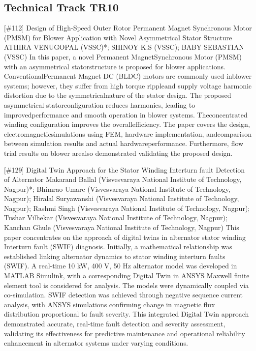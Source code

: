 \clearpage \subsection{Technical Track TR10}\nopagebreak {} \begin{abstract_online} {[\#112] Design of High-Speed Outer Rotor Permanent Magnet Synchronous Motor (PMSM) for Blower Application with Novel Asymmetrical Stator Structure} {} {ATHIRA VENUGOPAL (VSSC)*; SHINOY K.S (VSSC); BABY SEBASTIAN (VSSC)} {} In this paper, a novel Permanent MagnetSynchronous Motor (PMSM) with an asymmetrical statorstructure is proposed for blower applications. ConventionalPermanent Magnet DC (BLDC) motors are commonly used inblower systems; however, they suffer from high torque rippleand supply voltage harmonic distortion due to the symmetricalnature of the stator design. The proposed asymmetrical statorconfiguration reduces harmonics, leading to improvedperformance and smooth operation in blower systems. Theconcentrated winding configuration improves the overallefficiency. The paper covers the design, electromagneticsimulations using FEM, hardware implementation, andcomparison between simulation results and actual hardwareperformance. Furthermore, flow trial results on blower arealso demonstrated validating the proposed design. \end{abstract_online} 
{} \begin{abstract_online} {[\#129] Digital Twin Approach for the Stator Winding Interturn fault Detection of Alternator} {} {Makarand Ballal (Visvesvaraya National Institute of Technology, Nagpur)*; Bhimrao Umare (Visvesvaraya National Institute of Technology, Nagpur); Hiralal Suryawanshi (Visvesvaraya National Institute of Technology, Nagpur); Rashmi Singh (Visvesvaraya National Institute of Technology, Nagpur); Tushar Vilhekar (Visvesvaraya National Institute of Technology, Nagpur); Kanchan Ghule (Visvesvaraya National Institute of Technology, Nagpur)} {} This paper concentrates on the approach of digital twins in alternator stator winding Interturn fault (SWIF) diagnosis. Initially, a mathematical relationship was established linking alternator dynamics to stator winding interturn faults (SWIF). A real-time 10 kW, 400 V, 50 Hz alternator model was developed in MATLAB Simulink, with a corresponding Digital Twin in ANSYS Maxwell finite element tool is considered for analysis. The models were dynamically coupled via co-simulation. SWIF detection was achieved through negative sequence current analysis, with ANSYS simulations confirming change in magnetic flux distribution proportional to fault severity. This integrated Digital Twin approach demonstrated accurate, real-time fault detection and severity assessment, validating its effectiveness for predictive maintenance and operational reliability enhancement in alternator systems under varying conditions. \end{abstract_online} 

